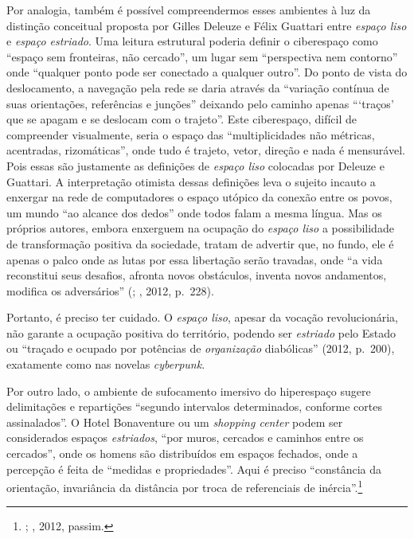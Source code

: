 Por analogia, também é possível compreendermos esses ambientes à luz da
distinção conceitual proposta por Gilles Deleuze e Félix Guattari entre
\emph{espaço liso} e \emph{espaço estriado}. Uma leitura
estrutural poderia definir o ciberespaço como ``espaço sem fronteiras,
não cercado'', um lugar sem ``perspectiva nem contorno'' onde ``qualquer
ponto pode ser conectado a qualquer outro''. Do ponto de vista do
deslocamento, a navegação pela rede se daria através da ``variação
contínua de suas orientações, referências e junções'' deixando pelo
caminho apenas ```traços' que se apagam e se deslocam com o trajeto''.
Este ciberespaço, difícil de compreender visualmente, seria o espaço das
``multiplicidades não métricas, acentradas, rizomáticas'', onde tudo é
trajeto, vetor, direção e nada é mensurável. Pois essas são justamente
as definições de \emph{espaço liso} colocadas por Deleuze e Guattari. A
interpretação otimista dessas definições leva o sujeito incauto a
enxergar na rede de computadores o espaço utópico da conexão entre os
povos, um mundo ``ao alcance dos dedos'' onde todos falam a mesma
língua. Mas os próprios autores, embora enxerguem na ocupação do
\emph{espaço liso} a possibilidade de transformação positiva da
sociedade, tratam de advertir que, no fundo, ele é apenas o palco onde
as lutas por essa libertação serão travadas, onde ``a vida reconstitui
seus desafios, afronta novos obstáculos, inventa novos andamentos,
modifica os adversários'' (; , 2012, p.~228).

Portanto, é preciso ter cuidado. O \emph{espaço liso}, apesar da vocação
revolucionária, não garante a ocupação positiva do território, podendo
ser \emph{estriado} pelo Estado ou ``traçado e ocupado por potências de
\emph{organização} diabólicas'' (2012, p.~200), exatamente como nas
novelas \emph{cyberpunk}.

Por outro lado, o ambiente de sufocamento imersivo do hiperespaço
sugere delimitações e repartições ``segundo intervalos
determinados, conforme cortes assinalados''. O Hotel Bonaventure ou um
\emph{shopping center} podem ser considerados espaços
\emph{estriados}, ``por muros, cercados e caminhos entre os cercados'',
onde os homens são distribuídos em espaços fechados, onde a percepção é
feita de ``medidas e propriedades''. Aqui é preciso ``constância da
orientação, invariância da distância por troca de referenciais de
inércia''.\footnote{; , 2012, passim.}

